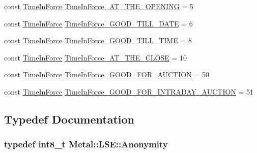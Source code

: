 \begin{DoxyCompactItemize}
\item 
const \hyperlink{namespaceMetal_1_1LSE_a59a4a742606e572af3f14a34a7503ee9}{Time\+In\+Force} \hyperlink{namespaceMetal_1_1LSE_a0e98ec1bac8f3b7fcd008fa3810bfbd0}{Time\+In\+Force\+\_\+\+A\+T\+\_\+\+T\+H\+E\+\_\+\+O\+P\+E\+N\+I\+N\+G} = 5
\item 
const \hyperlink{namespaceMetal_1_1LSE_a59a4a742606e572af3f14a34a7503ee9}{Time\+In\+Force} \hyperlink{namespaceMetal_1_1LSE_a55d883b4ec41f199c6f988addadef379}{Time\+In\+Force\+\_\+\+G\+O\+O\+D\+\_\+\+T\+I\+L\+L\+\_\+\+D\+A\+T\+E} = 6
\item 
const \hyperlink{namespaceMetal_1_1LSE_a59a4a742606e572af3f14a34a7503ee9}{Time\+In\+Force} \hyperlink{namespaceMetal_1_1LSE_aa73c7bddab5a84622566c046e2a1260e}{Time\+In\+Force\+\_\+\+G\+O\+O\+D\+\_\+\+T\+I\+L\+L\+\_\+\+T\+I\+M\+E} = 8
\item 
const \hyperlink{namespaceMetal_1_1LSE_a59a4a742606e572af3f14a34a7503ee9}{Time\+In\+Force} \hyperlink{namespaceMetal_1_1LSE_a4069d3ca752eb5fc5de24983613d0258}{Time\+In\+Force\+\_\+\+A\+T\+\_\+\+T\+H\+E\+\_\+\+C\+L\+O\+S\+E} = 10
\item 
const \hyperlink{namespaceMetal_1_1LSE_a59a4a742606e572af3f14a34a7503ee9}{Time\+In\+Force} \hyperlink{namespaceMetal_1_1LSE_af5d4cfd34dbfae7d3e41f29e2d6255fc}{Time\+In\+Force\+\_\+\+G\+O\+O\+D\+\_\+\+F\+O\+R\+\_\+\+A\+U\+C\+T\+I\+O\+N} = 50
\item 
const \hyperlink{namespaceMetal_1_1LSE_a59a4a742606e572af3f14a34a7503ee9}{Time\+In\+Force} \hyperlink{namespaceMetal_1_1LSE_a0b1351a9da90a1cb73c42f5b04377536}{Time\+In\+Force\+\_\+\+G\+O\+O\+D\+\_\+\+F\+O\+R\+\_\+\+I\+N\+T\+R\+A\+D\+A\+Y\+\_\+\+A\+U\+C\+T\+I\+O\+N} = 51
\end{DoxyCompactItemize}


\subsection{Typedef Documentation}
\hypertarget{namespaceMetal_1_1LSE_a0c110efde74bd7f4315615c477dac047}{}
\subsubsection[{Anonymity}]{\setlength{\rightskip}{0pt plus 5cm}typedef int8\+\_\+t {\bf Metal\+::\+L\+S\+E\+::\+Anonymity}}\label{namespaceMetal_1_1LSE_a0c110efde74bd7f4315615c477dac047}
\hypertarget{namespaceMetal_1_1LSE_a89c70e0ff27a052a68a981159295a760}{}
